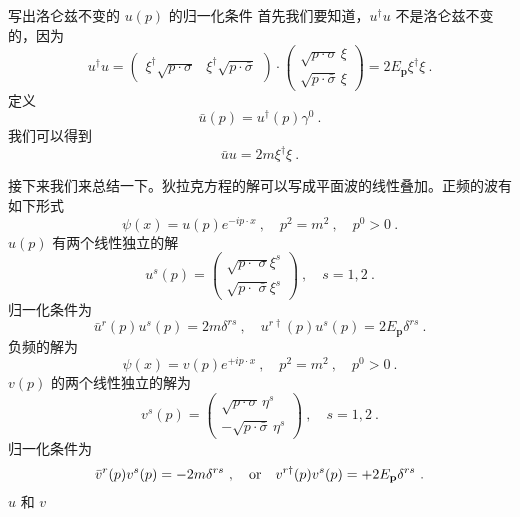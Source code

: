 \begin{exercise}{写出洛仑兹不变的 $u(p)$ 的归一化条件}
首先我们要知道，$u^\dagger u$ 不是洛仑兹不变的，因为\begin{equation}
u^\dagger u = \begin{pmatrix}
\xi^\dagger \sqrt{p\cdot\sigma} & \xi^\dagger \sqrt{p\cdot\bar\sigma}
\end{pmatrix}\cdot \begin{pmatrix}
\sqrt{p\cdot\sigma} \, \xi \\ 
\sqrt{p\cdot \bar\sigma} \, \xi
\end{pmatrix} = 2 E_{\mathbf p} \xi^\dagger \xi~.
\end{equation}
定义
\begin{equation}
\bar u(p) = u^\dagger (p) \gamma^0 ~.
\end{equation}
我们可以得到
\begin{equation}
\bar u u = 2 m \xi^\dagger \xi ~.
\end{equation}
\end{exercise}
接下来我们来总结一下。狄拉克方程的解可以写成平面波的线性叠加。正频的波有如下形式
\begin{equation}\label{eq_diracs_4}
\psi(x) = u(p) e^{-ip\cdot x}~, \quad p^2 = m^2 ~, \quad p^0>0 ~.
\end{equation}
$u(p)$ 有两个线性独立的解
\begin{equation}
u^s(p) = \begin{pmatrix}
\sqrt{p\cdot \,\, \sigma} \xi^s \\
\sqrt{p\cdot \,\, \bar \sigma} \xi^s
\end{pmatrix}~, \quad s = 1,2~.
\end{equation}
归一化条件为
\begin{equation}
\bar u^r (p) u^s (p) = 2 m \delta^{rs} ~, \quad u^{r\dagger} (p) u^s(p) = 2 E_{\mathbf p} \delta^{rs}~.
\end{equation}
负频的解为
\begin{equation}
\psi(x) = v(p) e^{+i p \cdot x} ~, \quad p^2 = m^2 ~, \quad p^0>0~.
\end{equation}
$v(p)$ 的两个线性独立的解为
\begin{equation}
v^s(p)=\begin{pmatrix}
\sqrt{p\cdot\sigma} \, \eta^s\\
-\sqrt{p\cdot\bar\sigma} \, \eta^s 
\end{pmatrix}~,\quad s = 1,2~.
\end{equation}
归一化条件为
\begin{equation}
\bar v^r(p) v^s(p) = -2 m \delta^{rs}~, \quad {\rm or} \quad v^{r\dagger}(p) v^s(p) = + 2 E_{\mathbf p} \delta^{rs}~.
\end{equation}
$u$ 和 $v$




